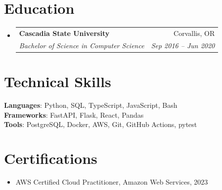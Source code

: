 \documentclass[letterpaper,11pt]{article}
\makeatletter
\newcommand{\resumeSubheading}[4]{
  \vspace{-2pt}\item
    \begin{tabular*}{0.97\textwidth}[t]{l@{\extracolsep{\fill}}r}
      \textbf{#1} & #2 \\
      \textit{\small#3} & \textit{\small #4} \\
    \end{tabular*}\vspace{-7pt}
}
\newcommand{\resumeSubHeadingListStart}{\begin{itemize}[leftmargin=0.15in, label={}]}
\newcommand{\resumeSubHeadingListEnd}{\end{itemize}}
\makeatother
\begin{document}
\section{Education}
  \resumeSubHeadingListStart
    \resumeSubheading
      {Cascadia State University}{Corvallis, OR}
      {Bachelor of Science in Computer Science}{Sep 2016 -- Jun 2020}
  \resumeSubHeadingListEnd

\section{Technical Skills}
 \begin{itemize}[leftmargin=0.15in, label={}]
    \small{\item{
     \textbf{Languages}{: Python, SQL, TypeScript, JavaScript, Bash} \\
     \textbf{Frameworks}{: FastAPI, Flask, React, Pandas} \\
     \textbf{Tools}{: PostgreSQL, Docker, AWS, Git, GitHub Actions, pytest}
    }}
 \end{itemize}

\section{Certifications}
 \begin{itemize}
   \item AWS Certified Cloud Practitioner, Amazon Web Services, 2023
 \end{itemize}
\end{document}
